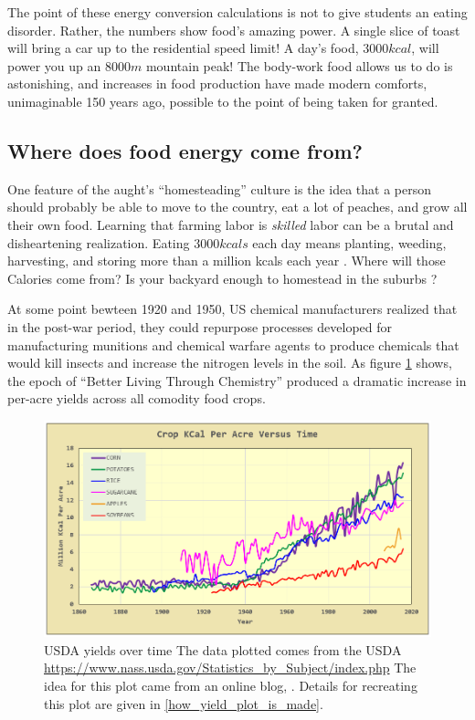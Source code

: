 \documentclass[12pt]{iopart}
\begin{document}
The point of these energy conversion calculations is not to give students an eating disorder.  Rather, the numbers show food's amazing power. A single slice of toast will bring a car up to the residential speed limit!  A day's food, $3000kcal$, will power you up an $8000m$ mountain peak! The body-work food allows us to do is astonishing, and increases in food production have made modern  comforts, unimaginable 150 years ago, possible to the point of being taken for granted.  

\subsection{Where does food energy come from?}
One feature of the aught's ``homesteading'' culture \cite{homesteading} is the idea that a person should probably be able to move to the country, eat a lot of peaches, and grow all their own food.  Learning that farming labor is \textit{skilled} labor can be a brutal and disheartening realization. Eating $3000kcals$ each day means planting, weeding, harvesting, and storing more than a million kcals each year \cite{Haspel}.  Where will those Calories come from? Is your backyard enough to homestead in the suburbs \cite{backyard_homestead}?

At some point bewteen 1920 and 1950, US chemical manufacturers realized that in the post-war period, they could repurpose processes developed for manufacturing munitions and chemical warfare agents to produce chemicals that would kill insects and increase the nitrogen levels in the soil. 
As figure \ref{ag_yields} shows, the epoch of ``Better Living Through Chemistry'' produced a dramatic increase in per-acre yields across all comodity food crops.  

\begin{figure}[ht!]
\centering
\includegraphics[width=\columnwidth]{yield_over_time.png}
\caption{
USDA yields over time
The data plotted comes from the USDA
\url{https://www.nass.usda.gov/Statistics_by_Subject/index.php}
The idea for this plot came from an online blog, \cite{math_encounters}.  
Details for recreating this plot are given in \ref{how_yield_plot_is_made}.
}
\label{ag_yields}
\end{figure}
\end{document}
